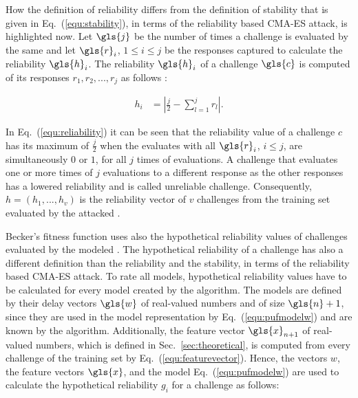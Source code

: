 How the definition of reliability differs from the definition of stability that is given in Eq.\ (\ref{equ:stability}), in terms of the reliability based \ac{CMA-ES} attack, is highlighted now.
Let $\gls{j}$ be the number of times a challenge is evaluated by the same \puf and let $\gls{r}_i$, $1 \le i \le j$ be the responses captured to calculate the reliability $\gls{h}_i$.
The reliability $\gls{h}_i$ of a challenge $\gls{c}$ is computed of its responses $r_1, r_2, ..., r_j$ as follows \cite{Becker2015ThePUFs}:

\begin{align}
h_i &= |\frac{j}{2} - \sum_{l = 1}^{j}r_l|. \label{equ:reliability}
\end{align}


In Eq.\ (\ref{equ:reliability}) it can be seen that the reliability value of a challenge $c$ has its maximum of $\frac{j}{2}$ when the \puf evaluates with all $\gls{r}_i$, $i \le j$, are simultaneously $0$ or $1$, for all $j$ times of evaluations. %
A challenge that evaluates one or more times of $j$ evaluations to a different response as the other responses has a lowered reliability and is called unreliable challenge.
Consequently, $h = (h_1, ..., h_v)$ is the reliability vector of $v$ challenges from the training set evaluated by the attacked \puf.

Becker's fitness function uses also the hypothetical reliability values of challenges evaluated by the modeled \pufs.
The hypothetical reliability of a challenge has also a different definition than the reliability and the stability, in terms of the reliability based \ac{CMA-ES} attack.
To rate all models, hypothetical reliability values have to be calculated for every model created by the algorithm.
The models are defined by their delay vectors $\gls{w}$ of real-valued numbers and of size $\gls{n} + 1$, since they are used in the \apuf model representation by Eq.\ (\ref{equ:pufmodelw}) and are known by the algorithm. %
Additionally, the feature vector $\gls{x}_{n+1}$ of real-valued numbers, which is defined in Sec.\ \ref{sec:theoretical}, is computed from every challenge of the training set by Eq.\ (\ref{equ:featurevector}).
Hence, the vectors $w$, the feature vectors $\gls{x}$, and the \apuf model Eq.\ (\ref{equ:pufmodelw}) are used to calculate the hypothetical reliability $g_i$ for a challenge as follows:

